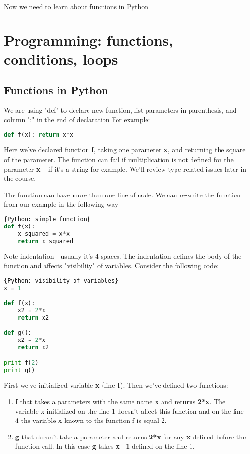 Now we need to learn about functions in Python

\section{Programming: functions, conditions, loops}
\subsection{Functions in Python}

We are using "def" to declare new function, list parameters in
parenthesis, and column ":" in the end of declaration
For example:

\begin{lstlisting}[style=codelst,language=Python]
def f(x): return x*x
\end{lstlisting}

Here we've declared function \textbf{f}, taking one parameter \textbf{x},
and returning the square of the parameter. The function
can fail if multiplication is not defined for the parameter \textbf{x} --
if it's a string for example. We'll review type-related
issues later in the course.

The function can have more than one line of code. We can re-write
the function from our example in the following way

\begin{lstlisting}[style=codelst,language=Python]{Python: simple function}
def f(x):
    x_squared = x*x
    return x_squared
\end{lstlisting}
Note indentation - usually it's 4 spaces. The indentation defines
the body of the function and affects "visibility" of variables. Consider the
following code:

\begin{lstlisting}[style=codelst,language=Python]{Python: visibility of variables}
x = 1

def f(x):
    x2 = 2*x
    return x2

def g():
    x2 = 2*x
    return x2

print f(2)
print g()
\end{lstlisting}
First we've initialized variable \textbf{x} (line 1). Then we've
defined two functions:

\begin{enumerate}
\item \textbf{f} that takes a parameters with the same
name \textbf{x} and returns \textbf{2*x}. The variable x initialized on
the line 1 doesn't affect this function and
on the line 4 the variable \textbf{x} known to
the function f is equal 2.
\item \textbf{g} that doesn't take a parameter and returns \textbf{2*x} for
any \textbf{x} defined before the function call. In this case \textbf{g}
takes \textbf{x=1} defined on the line 1.
\end{enumerate}

